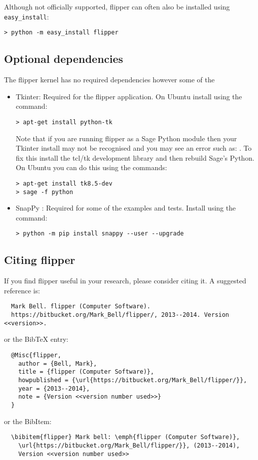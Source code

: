 \documentclass[a4paper]{article}
\newcommand{\exc}[1]{\mbox{\PVerb{#1}}}
\begin{document}
Although not officially supported, flipper can often also be installed using \texttt{easy\_install}:
\begin{lstlisting}
> python -m easy_install flipper
\end{lstlisting}

\subsection{Optional dependencies}

The flipper kernel has no required dependencies however some of the 

\begin{itemize}
\item Tkinter: Required for the flipper application. On Ubuntu install using the command:
\begin{lstlisting}
> apt-get install python-tk
\end{lstlisting}
Note that if you are running flipper as a Sage Python module then your Tkinter install may not be recognised and you may see an error such as: \exc{Error: no module named _tkinter}. To fix this install the tcl/tk development library and then rebuild Sage's Python. On Ubuntu you can do this using the commands:
\begin{lstlisting}
> apt-get install tk8.5-dev
> sage -f python
\end{lstlisting}
\item SnapPy \cite{SnapPy}: Required for some of the examples and tests. Install using the command:
\begin{lstlisting}
> python -m pip install snappy --user --upgrade
\end{lstlisting}
\end{itemize}

\subsection{Citing flipper}

If you find flipper useful in your research, please consider citing it. A suggested reference is:
\begin{verbatim}
  Mark Bell. flipper (Computer Software).
  https://bitbucket.org/Mark_Bell/flipper/, 2013--2014. Version <<version>>.
\end{verbatim}
or the BibTeX entry:
\begin{verbatim}
  @Misc{flipper,
    author = {Bell, Mark},
    title = {flipper (Computer Software)},
    howpublished = {\url{https://bitbucket.org/Mark_Bell/flipper/}},
    year = {2013--2014},
    note = {Version <<version number used>>}
  }
\end{verbatim}
or the BibItem:
\begin{verbatim}
  \bibitem{flipper} Mark bell: \emph{flipper (Computer Software)},
    \url{https://bitbucket.org/Mark_Bell/flipper/}}, (2013--2014),
    Version <<version number used>>
\end{verbatim}
\end{document}
